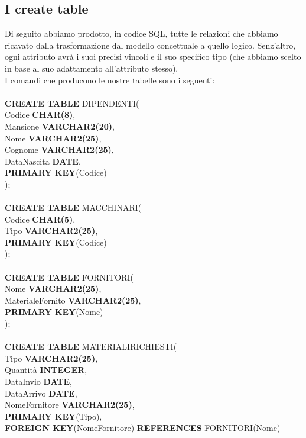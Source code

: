 \documentclass[a4paper,12pt,italian]{article}
\begin{document}
\subsection{I create table} 
Di seguito abbiamo prodotto, in codice SQL, tutte le relazioni che abbiamo ricavato dalla trasformazione dal modello concettuale a quello logico. Senz'altro, ogni attributo avrà i suoi precisi vincoli e il suo specifico tipo (che abbiamo scelto in base al suo adattamento all'attributo stesso). \\
I comandi che producono le nostre tabelle sono i seguenti: \\ \\
\textbf{CREATE TABLE} DIPENDENTI( \\
Codice \textbf{CHAR(8)}, \\
Mansione \textbf{VARCHAR2(20)}, \\
Nome \textbf{VARCHAR2(25)}, \\
Cognome \textbf{VARCHAR2(25)}, \\
DataNascita \textbf{DATE}, \\
\textbf{PRIMARY KEY}(Codice) \\
); \\ \\
\textbf{CREATE TABLE} MACCHINARI( \\
Codice \textbf{CHAR(5)}, \\
Tipo \textbf{VARCHAR2(25)}, \\
\textbf{PRIMARY KEY}(Codice) \\
); \\ \\
\textbf{CREATE TABLE} FORNITORI( \\
Nome \textbf{VARCHAR2(25)}, \\
MaterialeFornito \textbf{VARCHAR2(25)}, \\
\textbf{PRIMARY KEY}(Nome) \\
); \\ \\
\textbf{CREATE TABLE} MATERIALIRICHIESTI( \\
Tipo \textbf{VARCHAR2(25)}, \\
Quantità \textbf{INTEGER}, \\
DataInvio \textbf{DATE}, \\
DataArrivo \textbf{DATE}, \\
NomeFornitore \textbf{VARCHAR2(25)}, \\
\textbf{PRIMARY KEY}(Tipo), \\
\textbf{FOREIGN KEY}(NomeFornitore) \textbf{REFERENCES} FORNITORI(Nome) \\
\end{document}
